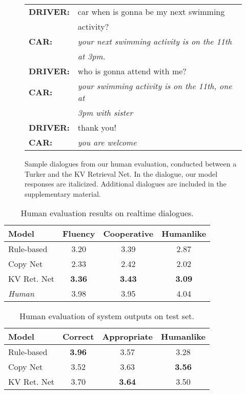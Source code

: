 \documentclass[11pt,a4paper]{article}
\begin{document}
\begin{figure}[ht]
  \vspace{6mm}


  \begin{tabular}{ll}
    \bf DRIVER: & car when is gonna be my next swimming \\
    & activity? \\
    \bf CAR: & \emph{your next swimming activity is on the 11th}\\
    & \emph{at 3pm.} \\
    \bf DRIVER: & who is gonna attend with me?\\ 
    \bf CAR: & \emph{your swimming activity is on the 11th, one at} \\
    & \emph{3pm with sister}\\
    \bf DRIVER: & thank you!\\
    \bf CAR: & \emph{you are welcome}\\
  \end{tabular}

  \caption{Sample dialogues from our human evaluation, conducted between a Turker and the KV Retrieval Net. In the dialogue, our model responses are italicized. Additional dialogues are included in the supplementary material.}
\end{figure}


\begin{table}
\centering
\small
\begin{tabular}{l|ccc}
{\bf Model} & {\bf Fluency} & {\bf Cooperative} & {\bf Humanlike} \\
\hline
Rule-based & 3.20 & 3.39 & 2.87 \\
Copy Net & 2.33 & 2.42 & 2.02\\
KV Ret. Net & \textbf{3.36} & \textbf{3.43} & \textbf{3.09} \\
\hline
\emph{Human} & 3.98 &  3.95 & 4.04 \\
\hline
\end{tabular}
\caption{Human evaluation results on realtime dialogues.}\label{tab:human-eval}
\end{table}


\begin{table}
\centering
\small
\begin{tabular}{l|ccc}
{\bf Model} & {\bf Correct} & {\bf Appropriate} & {\bf Humanlike} \\
\hline
Rule-based & \textbf{3.96} & 3.57 & 3.28 \\
Copy Net &  3.52 & 3.63 & \textbf{3.56}\\
KV Ret. Net &  3.70 & \textbf{3.64} & 3.50 \\
\hline
\end{tabular}
\caption{Human evaluation of system outputs on test set.}\label{tab:human-eval-test}
\end{table}
\end{document}

